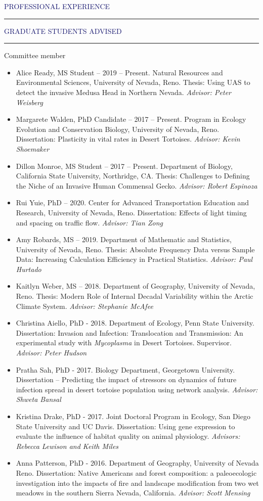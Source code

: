 \documentclass{resume} %
\renewenvironment{rSection}[1]{
\sectionskip
\textcolor{MidnightBlue}{\MakeUppercase{#1}}
\sectionlineskip
\hrule
\begin{list}{}{
\setlength{\leftmargin}{1.5em}
}
\item[]
}{
\end{list}
}
\begin{document}
\begin{rSection}{Professional Experience}
\begin{rSection}{Graduate Students Advised}
\begin{rSubsection}{Committee member}{}{}{}
\begin{itemize}
\item Alice Ready, MS Student – 2019 – Present. Natural Resources and Environmental Sciences, University of Nevada, Reno. Thesis: Using UAS to detect the invasive Medusa Head in Northern Nevada.  \textit{Advisor: Peter Weisberg}
\item Margarete Walden, PhD Candidate – 2017 – Present. Program in Ecology Evolution and Conservation Biology, University of Nevada, Reno. Dissertation: Plasticity in vital rates in Desert Tortoises. \textit{Advisor: Kevin Shoemaker}
\item Dillon Monroe, MS Student – 2017 – Present. Department of Biology, California State University, Northridge, CA. Thesis: Challenges to Defining the Niche of an Invasive Human Commensal Gecko. \textit{Advisor: Robert Espinoza}
\item Rui Yuie, PhD – 2020. Center for Advanced Transportation Education and Research, University of Nevada, Reno.  Dissertation: Effects of light timing and spacing on traffic flow. \textit{Advisor: Tian Zong}
\item Amy Robards, MS – 2019. Department of Mathematic and Statistics, University of Nevada, Reno. Thesis: Absolute Frequency Data versus Sample Data: Increasing Calculation Efficiency in Practical Statistics. \textit{Advisor: Paul Hurtado}
\item Kaitlyn Weber, MS – 2018. Department of Geography, University of Nevada, Reno. Thesis: Modern Role of Internal Decadal Variability within the Arctic Climate System. \textit{Advisor: Stephanie McAfee}
\item Christina Aiello, PhD - 2018. Department of Ecology, Penn State University. Dissertation: Invasion and Infection: Translocation and Transmission: An experimental study with \textit {Mycoplasma} in Desert Tortoises. Supervisor. \textit{Advisor: Peter Hudson}
\item Pratha Sah, PhD - 2017. Biology Department, Georgetown University. Dissertation – Predicting the impact of stressors on dynamics of future infection spread in desert tortoise population using network analysis. \textit{Advisor: Shweta Bansal}
\item Kristina Drake, PhD - 2017. Joint Doctoral Program in Ecology, San Diego State University and UC Davis. Dissertation: Using gene expression to evaluate the influence of habitat quality on animal physiology. \textit{Advisors: Rebecca Lewison and Keith Miles}
\item Anna Patterson, PhD - 2016. Department of Geography, University of Nevada Reno. Dissertation: Native Americans and forest composition: a paleoecologic investigation into the impacts of fire and landscape modification from two wet meadows in the southern Sierra Nevada, California. \textit{ Advisor: Scott Mensing}

\end{itemize}
\end{rSubsection}
\end{rSection}
\end{rSection}
\end{document}
